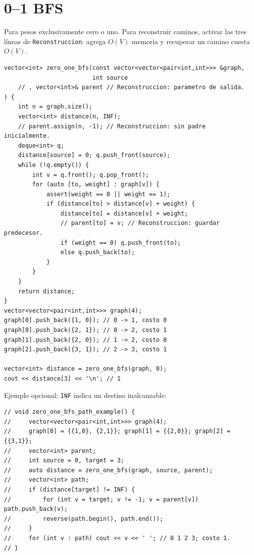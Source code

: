 
\section{0--1 BFS}

Para pesos exclusivamente cero o uno.
Para reconstruir caminos, activar las tres l\'ineas de \texttt{Reconstruccion}:
agrega $O(V)$ memoria y recuperar un camino cuesta $O(V)$.

\begin{lstlisting}[style=cpp]
vector<int> zero_one_bfs(const vector<vector<pair<int,int>>> &graph,
                         int source
    // , vector<int>& parent // Reconstruccion: parametro de salida.
) {
    int n = graph.size();
    vector<int> distance(n, INF);
    // parent.assign(n, -1); // Reconstruccion: sin padre inicialmente.
    deque<int> q;
    distance[source] = 0; q.push_front(source);
    while (!q.empty()) {
        int v = q.front(); q.pop_front();
        for (auto [to, weight] : graph[v]) {
            assert(weight == 0 || weight == 1);
            if (distance[to] > distance[v] + weight) {
                distance[to] = distance[v] + weight;
                // parent[to] = v; // Reconstruccion: guardar predecesor.
                if (weight == 0) q.push_front(to);
                else q.push_back(to);
            }
        }
    }
    return distance;
}
vector<vector<pair<int,int>>> graph(4);
graph[0].push_back({1, 0}); // 0 -> 1, costo 0
graph[0].push_back({2, 1}); // 0 -> 2, costo 1
graph[1].push_back({2, 0}); // 1 -> 2, costo 0
graph[2].push_back({3, 1}); // 2 -> 3, costo 1

vector<int> distance = zero_one_bfs(graph, 0);
cout << distance[3] << '\n'; // 1
\end{lstlisting}


Ejemplo opcional; \texttt{INF} indica un destino inalcanzable:
\begin{lstlisting}[style=cpp]
// void zero_one_bfs_path_example() {
//     vector<vector<pair<int,int>>> graph(4);
//     graph[0] = {{1,0}, {2,1}}; graph[1] = {{2,0}}; graph[2] = {{3,1}};
//     vector<int> parent;
//     int source = 0, target = 3;
//     auto distance = zero_one_bfs(graph, source, parent);
//     vector<int> path;
//     if (distance[target] != INF) {
//         for (int v = target; v != -1; v = parent[v]) path.push_back(v);
//         reverse(path.begin(), path.end());
//     }
//     for (int v : path) cout << v << ' '; // 0 1 2 3; costo 1.
// }
\end{lstlisting}

